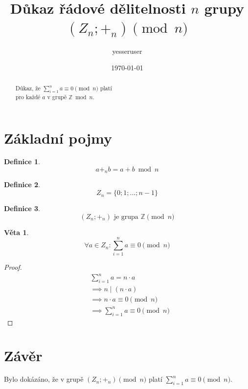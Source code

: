 \documentclass[a4paper,10pt]{article}
\title{Důkaz řádové dělitelnosti $n$ grupy $(Z_n; +_n) \pmod{n}$}
\author{yesseruser}
\date{\today}
\begin{document}
\maketitle

\begin{abstract}
	Důkaz, že $\sum^{n}_{i=1}a \equiv 0 \pmod n$ platí \\
	pro každé $a$ v grupě $\mathbb{Z} \bmod{n}$.
\end{abstract}

\section{Základní pojmy}

\newtheorem{definition}{Definice}
\begin{definition}
	\[
		a +_n b = a + b \bmod n
	\]
\end{definition}
\begin{definition}
	\[
		Z_n = \{0; 1; \dots; n - 1\}
	\]
\end{definition}
\begin{definition}
	\[
		(Z_n; +_n)\text{ je grupa } \mathbb{Z} \pmod n
	\]
\end{definition}

\newtheorem*{theorem}{Věta}
\begin{theorem}
	\[
		\forall a \in Z_n: \sum^{n}_{i=1}a \equiv 0 \pmod n
	\]
\end{theorem}

\begin{proof}
	\begin{align*}
		 & \sum^{n}_{i=1} a = n \cdot a               \\
		 & \implies n \mid (n \cdot a)                \\
		 & \implies n \cdot a \equiv 0 \pmod n        \\
		 & \implies  \sum^{n}_{i=1}a \equiv 0 \pmod n
	\end{align*}
\end{proof}

\section{Závěr}
Bylo dokázáno, že v grupě $(Z_n; +_n) \pmod{n}$ platí $\sum^{n}_{i=1}a \equiv 0 \pmod n$.
\end{document}
